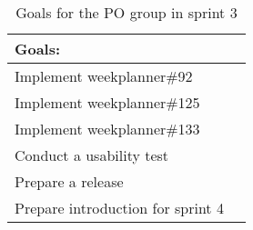 \begin{table}[H]
    \centering
    \begin{tabular}{|l|l|}
    \hline
    Goals:                                   \\ \hline
    Implement weekplanner\#92               \\ \hline
    Implement weekplanner\#125              \\ \hline
    Implement weekplanner\#133              \\ \hline
    Conduct a usability test                 \\ \hline
    Prepare a release                          \\ \hline
    Prepare introduction for sprint 4                         \\ \hline
    \end{tabular}
    \caption{Goals for the PO group in sprint 3}
    \label{PO-goal-sprint-3}
\end{table}
